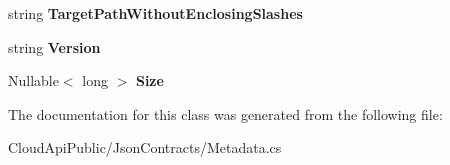 \begin{DoxyCompactItemize}
\item 
\hypertarget{class_cloud_api_public_1_1_json_contracts_1_1_metadata_a1fa6f22ba39888d1c7f4569f9931a751}{string {\bfseries Target\-Path\-Without\-Enclosing\-Slashes}}\label{class_cloud_api_public_1_1_json_contracts_1_1_metadata_a1fa6f22ba39888d1c7f4569f9931a751}

\item 
\hypertarget{class_cloud_api_public_1_1_json_contracts_1_1_metadata_a78e30603c5d7e62ec252fee301b6d4ad}{string {\bfseries Version}}\label{class_cloud_api_public_1_1_json_contracts_1_1_metadata_a78e30603c5d7e62ec252fee301b6d4ad}

\item 
\hypertarget{class_cloud_api_public_1_1_json_contracts_1_1_metadata_a319df2814cfb507aab29b83abe753557}{Nullable$<$ long $>$ {\bfseries Size}}\label{class_cloud_api_public_1_1_json_contracts_1_1_metadata_a319df2814cfb507aab29b83abe753557}

\end{DoxyCompactItemize}


The documentation for this class was generated from the following file\-:\begin{DoxyCompactItemize}
\item 
Cloud\-Api\-Public/\-Json\-Contracts/Metadata.\-cs\end{DoxyCompactItemize}
